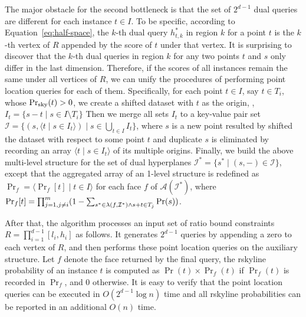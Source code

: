 The major obstacle for the second bottleneck is that the set of $2^{d-1}$ dual queries are different for each instance $t \in I$.
To be specific, according to Equation~\ref{eq:half-space}, the $k$-th dual query $h^*_{t, k}$ in region $k$ for a point $t$ is the $k$-th vertex of $R$ appended by the score of $t$ under that vertex.
It is surprising to discover that the $k$-th dual queries in region $k$ for any two points $t$ and $s$ only differ in the last dimension.
Therefore, if the scores of all instances remain the same under all vertices of $R$, we can unify the procedures of performing point location queries for each of them.
Specifically, for each point $t \in I$, say $t \in T_i$, whose $\Pr_{\rm sky}(t) > 0$, we create a shifted dataset with $t$ as the origin, \ie, $I_t = \{s - t \mid s \in I \setminus T_i\}$
Then we merge all sets $I_t$ to a key-value pair set $\mathcal{I} = \{(s, \langle t \mid s \in I_t \rangle) \mid s \in \bigcup_{t \in I} I_t\}$, where $s$ is a new point resulted by shifted the dataset with respect to some point $t$ and duplicate $s$ is eliminated by recording an array $\langle t \mid s \in I_t \rangle$ of its multiple origins.
Finally, we build the above multi-level structure for the set of dual hyperplanes $\mathcal{I}^* = \{s^* \mid (s, -) \in \mathcal{I}\}$, except that the aggregated array of an 1-level structure is redefined as $\Pr_f = \langle \Pr_f[t] \mid t \in I \rangle$ for each face $f$ of $\mathcal{A}(\mathcal{I}^*)$, where ${\rm Pr}_f[t] = \prod^m_{j= 1, j \ne i}(1 - \sum_{s^* \in \lambda(f, \mathcal{I}^*) \wedge s + t \in T_j}\Pr(s))$.

After that, the algorithm processes an input set of ratio bound constraints $R = \prod^{d-1}_{i=1}[l_i, h_i]$ as follows.
It generates $2^{d-1}$ queries by appending a zero to each vertex of $R$, and then performs these point location queries on the auxiliary structure.
Let $f$ denote the face returned by the final query, the rskyline probability of an instance $t$ is computed as $\Pr(t) \times \Pr_f(t)$ if $\Pr_f(t)$ is recorded in $\Pr_f$, and 0 otherwise.
It is easy to verify that the point location queries can be executed in $O(2^{d-1}\log{n})$ time and all rskyline probabilities can be reported in an additional $O(n)$ time.
